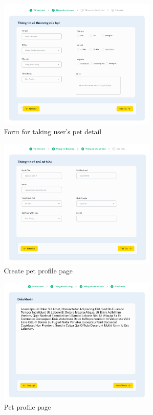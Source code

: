 \begin{figure}[H]
    \centering
    \includegraphics[width=0.7\textwidth]{Figures/pet_input_ui.png}
    \caption{Form for taking user’s pet detail}
\end{figure}

\begin {figure}[H]
\centering
\includegraphics[width=0.7\textwidth]{Figures/user_input_ui.png}
\caption{Create pet profile page}
\end{figure}

\begin {figure}[H]
\centering
\includegraphics[width=0.7\textwidth]{Figures/term_ui.png}
\caption{Pet profile page}
\end{figure}

